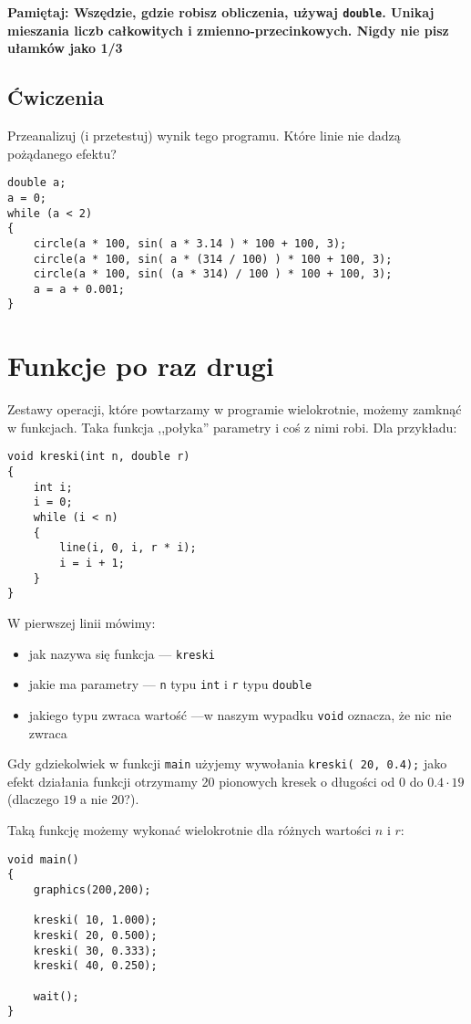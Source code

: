 \documentclass{instrukcja}
\begin{document}
{\bf{\red Pamiętaj:} Wszędzie, gdzie robisz obliczenia, używaj {\tt double}. Unikaj mieszania liczb całkowitych i zmienno-przecinkowych. Nigdy nie pisz ułamków jako 1/3}

\subsection*{Ćwiczenia}
Przeanalizuj (i przetestuj) wynik tego programu. Które linie nie dadzą pożądanego efektu?
\begin{verbatim}
double a;
a = 0;
while (a < 2)
{
    circle(a * 100, sin( a * 3.14 ) * 100 + 100, 3);
    circle(a * 100, sin( a * (314 / 100) ) * 100 + 100, 3);
    circle(a * 100, sin( (a * 314) / 100 ) * 100 + 100, 3);
    a = a + 0.001;
}
\end{verbatim}

\section{Funkcje po raz drugi}
Zestawy operacji, które powtarzamy w programie wielokrotnie, możemy zamknąć w funkcjach. Taka funkcja ,,połyka'' parametry i coś z nimi robi. Dla przykładu:
\begin{verbatim}
void kreski(int n, double r)
{
    int i;
    i = 0;
    while (i < n)
    {
        line(i, 0, i, r * i);
        i = i + 1;
    }
}
\end{verbatim}
W pierwszej linii mówimy:
\begin{itemize}
\item jak nazywa się funkcja --- {\tt kreski}
\item jakie ma parametry --- {\tt n} typu {\tt int} i {\tt r} typu {\tt double}
\item jakiego typu zwraca wartość ---w naszym wypadku {\tt void} oznacza, że nic nie zwraca
\end{itemize}

Gdy gdziekolwiek w funkcji {\tt main} użyjemy wywołania {\tt kreski( 20, 0.4);} jako efekt działania funkcji otrzymamy 20 pionowych kresek o długości od $0$ do $0.4\cdot 19$ (dlaczego $19$ a nie $20$?).

Taką funkcję możemy wykonać wielokrotnie dla różnych wartości $n$ i $r$:
\begin{verbatim}
void main()
{
    graphics(200,200);

    kreski( 10, 1.000);	
    kreski( 20, 0.500);	
    kreski( 30, 0.333);	
    kreski( 40, 0.250);	
	
    wait();
}
\end{verbatim}
\end{document}
